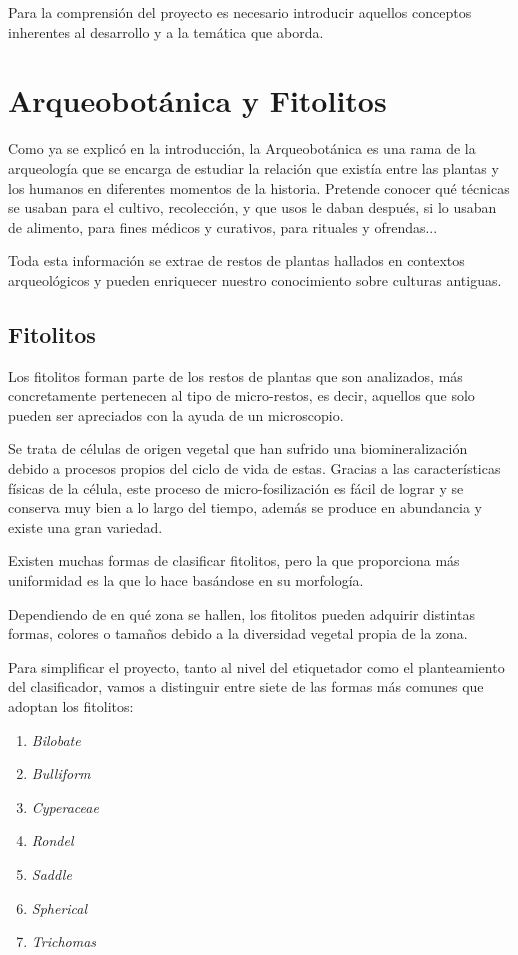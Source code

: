 
Para la comprensión del proyecto es necesario introducir aquellos conceptos inherentes al desarrollo y a la temática que aborda. 

\section{Arqueobotánica y Fitolitos}
Como ya se explicó en la introducción, la Arqueobotánica\cite{archeo} es una rama de la arqueología que se encarga de estudiar la relación que existía entre las plantas y los humanos en diferentes momentos de la historia. Pretende conocer qué técnicas se usaban para el cultivo, recolección, y que usos le daban después, si lo usaban de alimento, para fines médicos y curativos, para rituales y ofrendas...

Toda esta información se extrae de restos de plantas hallados en contextos arqueológicos y pueden enriquecer nuestro conocimiento sobre culturas antiguas.

\subsection{Fitolitos}
Los fitolitos\cite{fitolito} forman parte de los restos de plantas que son analizados, más concretamente pertenecen al tipo de micro-restos, es decir, aquellos que solo pueden ser apreciados con la ayuda de un microscopio.\cite{fito} 

Se trata de células de origen vegetal que han sufrido una biomineralización debido a procesos propios del ciclo de vida de estas. Gracias a las características físicas de la célula, este proceso de micro-fosilización es fácil de lograr y se conserva muy bien a lo largo del tiempo, además se produce en abundancia y existe una gran variedad.

Existen muchas formas de clasificar fitolitos, pero la que proporciona más uniformidad es la que lo hace basándose en su morfología. 

 Dependiendo de en qué zona se hallen, los fitolitos pueden adquirir distintas formas, colores o tamaños debido a la diversidad vegetal propia de la zona.

Para simplificar el proyecto, tanto al nivel del etiquetador como el planteamiento del clasificador, vamos a distinguir entre siete de las formas más comunes que adoptan los fitolitos:

\begin{enumerate}
	\item \textit{Bilobate}
	\item \textit{Bulliform}
	\item \textit{Cyperaceae}
	\item \textit{Rondel}
	\item \textit{Saddle}
	\item \textit{Spherical}
	\item \textit{Trichomas}
\end{enumerate}


